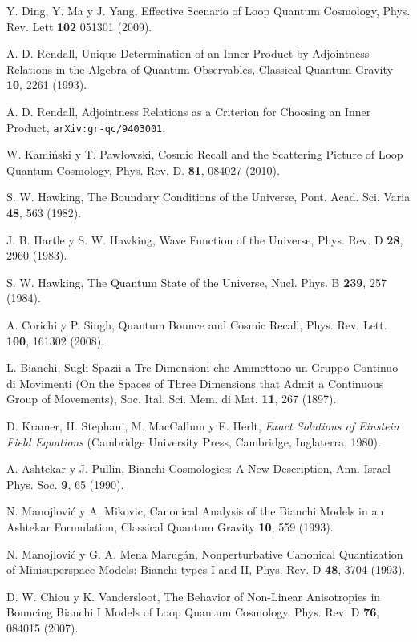 \begin{thebibliography}{999}
 Y. Ding, Y. Ma y J. Yang, Effective Scenario of Loop Quantum Cosmology, Phys. Rev.
Lett {\bf 102} 051301 (2009).

 A. D. Rendall, Unique Determination of an Inner Product by Adjointness Relations in
the Algebra of Quantum Observables, Classical Quantum Gravity {\bf 10}, 2261 (1993).

 A. D. Rendall, Adjointness Relations as a Criterion for Choosing an Inner Product, 
\texttt{arXiv:gr-qc/9403001}.

 W. Kami\'nski y T. Paw{\l}owski, Cosmic Recall and the Scattering
Picture of Loop Quantum Cosmology, Phys. Rev. D. {\bf81}, 084027 (2010).

 S. W. Hawking, The Boundary Conditions of the Universe, Pont. Acad. Sci. Varia
{\bf48}, 563 (1982).

 J. B. Hartle y S. W. Hawking, Wave Function of the Universe, Phys. Rev. D {\bf
28}, 2960 (1983).

 S. W. Hawking, The Quantum State of the Universe, Nucl. Phys. B
{\bf239}, 257 (1984).

 A. Corichi y P. Singh, Quantum Bounce and Cosmic Recall, Phys. Rev. Lett. {\bf
100}, 161302 (2008).



 L. Bianchi, Sugli Spazii a Tre Dimensioni che Ammettono un Gruppo Continuo di
Movimenti (On the Spaces of Three Dimensions that Admit a Continuous Group of Movements), Soc.
Ital. Sci. Mem. di Mat. {\bf11}, 267 (1897).

 D. Kramer, H. Stephani, M. MacCallum y E. Herlt, {\it Exact Solutions of Einstein
Field Equations} (Cambridge University Press, Cambridge, Inglaterra, 1980).

 A. Ashtekar y J. Pullin, Bianchi Cosmologies: A New Description, Ann. Israel
Phys. Soc. {\bf 9}, 65 (1990).

 N. Manojlovi\'c  y A. Mikovic, Canonical Analysis of the Bianchi Models in an
Ashtekar Formulation, Classical Quantum Gravity {\bf10}, 559 (1993).

 N. Manojlovi\'{c} y G. A. Mena Marug\'{a}n, Nonperturbative Canonical Quantization of
Minisuperspace Models: Bianchi types I and II, Phys. Rev. D {\bf 48}, 3704 (1993).


 D. W. Chiou y K. Vandersloot, The Behavior of Non-Linear Anisotropies in Bouncing
Bianchi I Models of Loop Quantum Cosmology, Phys. Rev. D {\bf76}, 084015 (2007).


\end{thebibliography}
